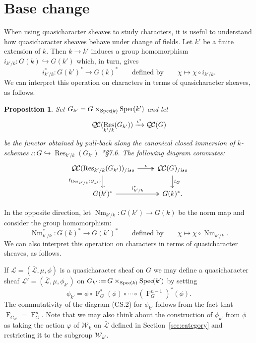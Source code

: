 \documentclass[11pt]{amsart}
\theoremstyle{plain}
\newtheorem{proposition}[theorem]{Proposition}
\theoremstyle{definition}
\theoremstyle{remark}
\newcommand{\Spec}[1]{{\operatorname{Spec}\hskip-1pt( #1 )}}
\newcommand{\Frob}[1]{\operatorname{F}_{#1}}
\DeclareMathOperator{\Res}{Res}
\DeclareMathOperator{\Nm}{Nm}
\newcommand{\ceq}{{\, :=\, }}
\newcommand{\cs}[1]{{\mathcal{#1}}}
\newcommand{\gcs}[1]{{\mathcal{\bar #1}}}
\newcommand{\QC}{{\mathcal{Q\hskip-0.8pt C}}}
\newcommand{\QCiso}[1]{\QC(#1)_{/\textit{iso}}}
\newcommand{\Weil}[1]{\mathcal{W}_{#1}}
\newcommand{\trFrob}[1]{t_{#1}}
\begin{document}
\section{Base change}\label{sec:basechange}

When using quasicharacter sheaves to study characters, it is useful to understand
how quasicharacter sheaves behave under change of fields.
Let $k'$ be a finite extension of $k$. Then $k\to k'$ induces a group homomorphism $i_{k'/k} : G(k) \hookrightarrow G(k')$ which, in turn, gives
\[
i_{k'/k}^* : G(k')^* \to G(k)^* \qquad \text{defined by}\qquad \chi \mapsto \chi\circ i_{k'/k}.
\]
We can interpret this operation on characters in terms of quasicharacter sheaves, as follows.
%

\begin{proposition} \label{prop:csbe}
Set $G_{k'} = G\times_\Spec{k} \Spec{k'}$ and let
\[
\QC(\Res_{k'/k}(G_{k'})) \xrightarrow{\iota^*} \QC(G)
\]
be the functor obtained by pull-back along the canonical closed immersion of $k$-schemes  $\iota : G \hookrightarrow \Res_{k'/k}(G_{k'})$ \cite{BLR}*{\S 7.6}. 
The following diagram commutes:
\[
\begin{tikzcd}
\QCiso{\Res_{k'/k}(G_{k'})} \arrow[two heads]{r}{\iota} \dar[swap]{\trFrob{\Res_{k'/k}(G_{k'})}} & \QCiso{G} \dar{\trFrob{G}} \\
G(k')^* \arrow[two heads]{r}{i_{k'/k}^*} & G(k)^*.
\end{tikzcd}
\]
\end{proposition}

In the opposite direction, let $\Nm_{k'/k} : G(k') \to G(k)$ be the norm map and consider the group homomorphism:
\[
\Nm_{k'/k}^* : G(k)^* \to G(k')^* \qquad \text{defined by}\qquad \chi \mapsto \chi\circ \Nm_{k'/k}.
\]
We can also interpret this operation on characters in terms of quasicharacter sheaves, as follows.

If $\cs{L} = (\gcs{L}, \mu, \phi)$ is a quasicharacter sheaf on $G$ we may define
a quasicharacter sheaf $\cs{L}' = (\gcs{L}, \mu, \phi_{k'})$ on 
$G_{k'}\ceq G\times_{\Spec{k}} \Spec{k'}$ by setting
\[
\phi_{k'} = \phi \circ \Frob{G}^*(\phi) \circ \cdots \circ (\Frob{G}^{n-1})^*(\phi).
\]
The commutativity of the diagram (CS.2) for $\phi_{k'}$ 
follows from the fact that $\Frob{G_{k'}} = \Frob{G}^n$.
Note that we may also think about the construction of $\phi_{k'}$ from $\phi$
as taking the action $\varphi$ of $\Weil{k}$ on $\gcs{L}$ 
defined in Section~\ref{sec:category} and restricting it to the subgroup $\Weil{k'}$.
\end{document}
